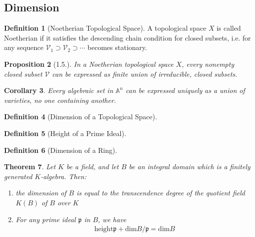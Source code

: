 \documentclass[11pt]{book}
\newtheorem{theorem}{Theorem}[section]
\newtheorem{proposition}[theorem]{Proposition}
\newtheorem{corollary}[theorem]{Corollary}
\theoremstyle{definition}
\newtheorem{definition}[theorem]{Definition}
\numberwithin{equation}{section}
\begin{document}
\newpage
\subsection*{Dimension}
%
%
%
\begin{defbox}
    \begin{definition}[Noetherian Topological Space]
        A topological space \(X\) is called Noetherian if it satisfies the descending chain condition for closed subsets, i.e. for any sequence \(\mathcal{V}_1 \supset \mathcal{V}_2 \supset \cdots\) becomes stationary.
    \end{definition}
\end{defbox}
\begin{thmbox}
    \begin{proposition}[1.5.]
        In a Noetherian topological space \(X\), every nonempty closed subset \(\mathcal{V}\) can be expressed as finite union of irreducible, closed subsets.
    \end{proposition}
\end{thmbox}
\begin{thmbox}
    \begin{corollary}
        Every algebraic set in \(\mathbb{A}^n\) can be expressed uniquely as a union of varieties, no one containing another.
    \end{corollary}
\end{thmbox}
\begin{defbox}
    \begin{definition}[Dimension of a Topological Space]
        
    \end{definition}
\end{defbox}
\begin{defbox}
    \begin{definition}[Height of a Prime Ideal]
        
    \end{definition}
\end{defbox}
\begin{defbox}
    \begin{definition}[Dimension of a Ring]
        
    \end{definition}
\end{defbox}
\begin{thmbox}
    \begin{theorem}
        Let \(K\) be a field, and let \(B\) be an integral domain which is a finitely generated \(K\)-algebra. Then:
        \begin{enumerate}
            \item the dimension of \(B\) is equal to the transcendence degree of the quotient field \(K(B)\) of \(B\) over \(K\)
            \item For any prime ideal \(\mathfrak{p}\) in \(B\), we have
            \begin{align*}
                \text{height} \mathfrak{p} + \text{dim} B / \mathfrak{p} = \text{dim} B
            \end{align*}
        \end{enumerate}
    \end{theorem}
\end{thmbox}
\end{document}

